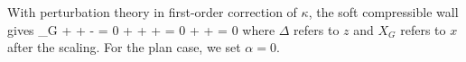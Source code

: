 With perturbation theory in first-order correction of $\kappa$, the soft compressible wall gives 
\beq {}_G +   +   -  \sin\alpha = 0  \eeq
\beq \ddot{\Delta} + \xi {} +   + \cos\alpha = 0   \eeq
\beq \ddot{\Theta} +  \frac{\dot\Theta}{\sqrt\Delta} +   = 0  \eeq
where $\Delta$ refers to $z$ and $X_G$ refers to $x$ after the scaling. For the plan case, we set $\alpha=0$. %
